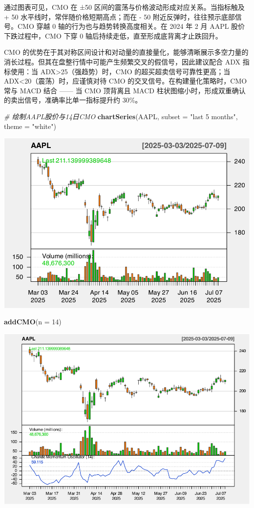\documentclass[]{ctexbook}
\newenvironment{Shaded}{\begin{snugshade}}{\end{snugshade}}
\newcommand{\AttributeTok}[1]{\textcolor[rgb]{0.13,0.29,0.53}{#1}}
\newcommand{\CommentTok}[1]{\textcolor[rgb]{0.56,0.35,0.01}{\textit{#1}}}
\newcommand{\DecValTok}[1]{\textcolor[rgb]{0.00,0.00,0.81}{#1}}
\newcommand{\FunctionTok}[1]{\textcolor[rgb]{0.13,0.29,0.53}{\textbf{#1}}}
\newcommand{\NormalTok}[1]{#1}
\newcommand{\StringTok}[1]{\textcolor[rgb]{0.31,0.60,0.02}{#1}}
\begin{document}
通过图表可见，CMO 在 ±50 区间的震荡与价格波动形成对应关系。当指标触及 + 50 水平线时，常伴随价格短期高点；而在 - 50 附近反弹时，往往预示底部信号。CMO 穿越 0 轴的行为也与趋势转换高度相关。在 2024 年 2 月 AAPL 股价下跌过程中，CMO 下穿 0 轴后持续走低，直至形成底背离才止跌回升。

CMO 的优势在于其对称区间设计和对动量的直接量化，能够清晰展示多空力量的消长过程。但其在盘整行情中可能产生频繁交叉的假信号，因此建议配合 ADX 指标使用：当 ADX\textgreater25（强趋势）时，CMO 的超买超卖信号可靠性更高；当 ADX\textless20（震荡）时，应谨慎对待 CMO 的交叉信号。在构建量化策略时，CMO 常与 MACD 结合 ------ 当 CMO 顶背离且 MACD 柱状图缩小时，形成双重确认的卖出信号，准确率比单一指标提升约 30\%。

\begin{Shaded}
\begin{Highlighting}[]
\CommentTok{\# 绘制AAPL股价与14日CMO}
\FunctionTok{chartSeries}\NormalTok{(AAPL, }\AttributeTok{subset =} \StringTok{"last 5 months"}\NormalTok{, }\AttributeTok{theme =} \StringTok{"white"}\NormalTok{)}
\end{Highlighting}
\end{Shaded}

\includegraphics[width=0.9\linewidth]{quantmod_files/figure-latex/cmo_2-1}

\begin{Shaded}
\begin{Highlighting}[]
\FunctionTok{addCMO}\NormalTok{(}\AttributeTok{n =} \DecValTok{14}\NormalTok{)}
\end{Highlighting}
\end{Shaded}

\includegraphics[width=0.9\linewidth]{quantmod_files/figure-latex/cmo_2-2}
\end{document}
